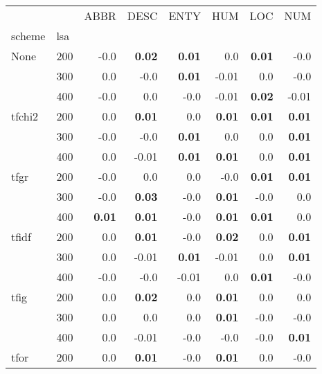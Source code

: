 \begin{table}[H]
\begin{center}

\begin{tabular}{ll|rrrrrr}
\toprule
   &   & ABBR & DESC & ENTY & HUM & LOC & NUM \\
scheme & lsa &         &         &         &         &         &         \\
\midrule
None & 200 &       -0.0 &  \textbf{0.02} &  \textbf{0.01} &       0.0 &  \textbf{0.01} &      -0.0 \\
   & 300 &       0.0 &       -0.0 &  \textbf{0.01} &      -0.01 &       0.0 &      -0.0 \\
   & 400 &       -0.0 &       0.0 &       -0.0 &      -0.01 &  \textbf{0.02} &      -0.01 \\
tfchi2 & 200 &       0.0 &  \textbf{0.01} &       0.0 &  \textbf{0.01} &  \textbf{0.01} &  \textbf{0.01} \\
   & 300 &       -0.0 &       -0.0 &  \textbf{0.01} &       0.0 &       0.0 &  \textbf{0.01} \\
   & 400 &       0.0 &      -0.01 &  \textbf{0.01} &  \textbf{0.01} &       0.0 &  \textbf{0.01} \\
tfgr & 200 &       -0.0 &       0.0 &       0.0 &      -0.0 &  \textbf{0.01} &  \textbf{0.01} \\
   & 300 &       -0.0 &  \textbf{0.03} &       -0.0 &  \textbf{0.01} &      -0.0 &       0.0 \\
   & 400 &  \textbf{0.01} &  \textbf{0.01} &       -0.0 &  \textbf{0.01} &  \textbf{0.01} &       0.0 \\
tfidf & 200 &       0.0 &  \textbf{0.01} &       -0.0 &  \textbf{0.02} &       0.0 &  \textbf{0.01} \\
   & 300 &       0.0 &      -0.01 &  \textbf{0.01} &      -0.01 &       0.0 &  \textbf{0.01} \\
   & 400 &       -0.0 &       -0.0 &      -0.01 &       0.0 &  \textbf{0.01} &      -0.0 \\
tfig & 200 &       0.0 &  \textbf{0.02} &       0.0 &  \textbf{0.01} &       0.0 &       0.0 \\
   & 300 &       0.0 &       0.0 &       0.0 &  \textbf{0.01} &      -0.0 &      -0.0 \\
   & 400 &       0.0 &      -0.01 &       -0.0 &      -0.0 &      -0.0 &  \textbf{0.01} \\
tfor & 200 &       0.0 &  \textbf{0.01} &       -0.0 &  \textbf{0.01} &       0.0 &      -0.0 \\

\end{tabular}
\end{center}
\end{table}
